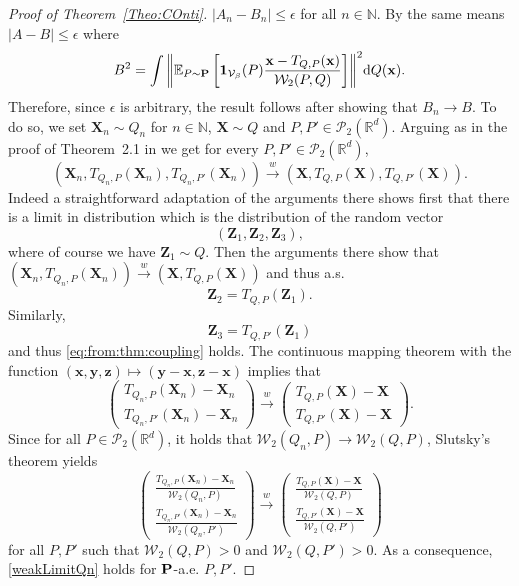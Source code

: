 \documentclass{imsart}
\numberwithin{equation}{section}
\def\N{\mathbb{N}}
\def\Z{\mathbf{Z}}
\def\R{\mathbb{R}}
\def\E{\mathbb{E}}
\def\z{\mathbf{z}}
\def\x{\mathbf{x}}
\def\y{\mathbf{y}}
\def\X{\mathbf{X}}
\def\E{\mathbb E}
\def\N{\mathbb N}
\def\x{\mathbf x}
\def\z{\mathbf z}
\def\y{\mathbf y}
\begin{document}
\begin{proof}[Proof of Theorem~\ref{Theo:COnti}]
	$ |A_n-B_n|\leq \epsilon $ for all $n\in \N$. By the same means 
	$ |A-B|\leq \epsilon $ where 
	$$ B^2=\int{ \left\|\E_{P\sim \mathbf{P}}\left[ {\bf 1}_{\mathcal{V}_\beta}(P) \frac{\x-T_{Q,P}(\x) }{\mathcal{W}_2(P,Q)}\right]\right\|^2} \mathrm{d}Q(\x).$$
	Therefore, since   $ \epsilon$ is arbitrary,  the result follows after showing that $B_n\to B$. To do so, we set $\X_n\sim Q_n$ for $n\in \N$, $\X \sim Q$ 
	and $P, P'\in \mathcal{P}_2(\R^d)$.
	Arguing as in the proof of Theorem~2.1 in \cite{BodhisattvaDeb} we get for every $P,P' \in \mathcal{P}_2(\R^d)$, 
	\begin{equation} \label{eq:from:thm:coupling}
		(\X_n,T_{Q_n,P}(\X_n),T_{Q_n,P'}(\X_n))
		\xrightarrow{w} 
		(\X,T_{Q,P}(\X),T_{Q,P'}(\X)).
	\end{equation}
	Indeed a straightforward adaptation of the arguments there shows first that there is a limit in distribution which is the distribution of the random vector
	\[
	( \Z_1,\Z_2,\Z_3),
	\]
	where of course we have $\Z_1 \sim Q$. Then the arguments there show that $(\X_n,T_{Q_n,P}(\X_n)) \xrightarrow{w}  (\X,T_{Q,P}(\X))$ and thus a.s.
	\[
	\Z_2 = T_{Q,P}(\Z_1).
	\]
	Similarly,
	\[
	\Z_3 = T_{Q,P'}(\Z_1)
	\]
	and thus \eqref{eq:from:thm:coupling} holds. The continuous mapping theorem with the function 
	$ (\x, \y,\z)\mapsto (\y-\x, \z-\x)$ implies that
	$$ 
	\begin{pmatrix}
		T_{Q_n,P}(\X_n) -\X_n \\
		T_{Q_n,P'}(\X_n) -\X_n
	\end{pmatrix}
	\xrightarrow{w} 
	\begin{pmatrix}
		T_{Q,P}(\X) -\X  \\
		T_{Q,P'}(\X) -\X 
	\end{pmatrix}.
	$$
	Since for all $P\in \mathcal{P}_2(\R^d)$, it holds that $\mathcal{W}_2(Q_n,P)\to \mathcal{W}_2(Q,P) $, Slutsky's theorem
	yields 
	\begin{equation}
		\label{weakLimitQn}
		\begin{pmatrix}
			\frac{T_{Q_n,P}(\X_n) -\X_n}{\mathcal{W}_2(Q_n,P)} 
			\\
			\frac{T_{Q_n,P'}(\X_n) -\X_n}{\mathcal{W}_2(Q_n,P')} 
		\end{pmatrix}
		\xrightarrow{w}
		\begin{pmatrix}
			\frac{T_{Q,P}(\X) -\X}{\mathcal{W}_2(Q,P)} \\
			\frac{T_{Q,P'}(\X) -\X}{\mathcal{W}_2(Q,P')}
		\end{pmatrix}
	\end{equation}
	for  all $ P , P' $ such that $\mathcal{W}_2(Q,P)>0$ and $\mathcal{W}_2(Q,P')>0$. As a consequence, \eqref{weakLimitQn} holds for ${\bf P}$-a.e. $P,P'$.  
	

\end{proof}
\end{document}
